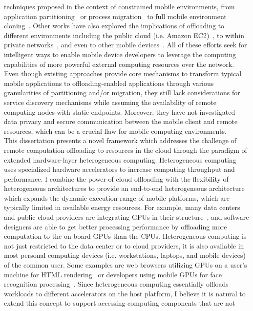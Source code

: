 techniques proposed in the context of constrained mobile environments,
from application partitioning~\cite{maui} or process
migration~\cite{hung} to full mobile environment
cloning~\cite{clonecloud}.
%
Other works have also explored the implications of offloading to
different environments including the public cloud (i.e. Amazon
EC2)~\cite{hung}, to within private networks~\cite{shigeru}, and even to
other mobile devices~\cite{serendipity}.
%
All of these efforts seek for intelligent ways to enable mobile device
developers to leverage the computing capabilities of more powerful
external computing resources over the network.
%
Even though existing approaches provide core mechanisms to transform
typical mobile applications to offloading-enabled applications through
various granularities of partitioning and/or migration, they still lack
considerations for service discovery mechanisms while assuming the
availability of remote computing nodes with static endpoints.
%
Moreover, they have not investigated data privacy and secure
communication between the mobile client and remote resources, which can
be a crucial flaw for mobile computing environments.\\
%
This dissertation presents a novel framework which addresses the challenge
of remote computation offloading to resources in the cloud through the
paradigm of extended hardware-layer heterogeneous computing.
%
Heterogeneous computing uses specialized hardware accelerators to
increase computing throughput and performance.
%
I combine the power of cloud offloading with the flexibility of
heterogeneous architectures to provide an end-to-end heterogeneous
architecture which expands the dynamic execution range of mobile
platforms, which are typically limited in available energy resources.
%
For example, many data centers and public cloud providers are
integrating GPUs in their structure~\cite{bowman}, and software
designers are able to get better processing performance by offloading
more computation to the on-board GPUs than the CPUs.
%
Heterogeneous computing is not just restricted to the data center or to
cloud providers, it is also available in most personal computing
devices (i.e. workstations, laptops, and mobile devices) of the common
user.
%
Some examples are web browsers utilizing GPUs on a user's machine for
HTML rendering~\cite{paul} or developers using mobile GPUs for face
recognition processing~\cite{burns}.
%
Since heterogeneous computing essentially offloads workloads to
different accelerators on the host platform, I believe it is natural
to extend this concept to support accessing computing components that are not
